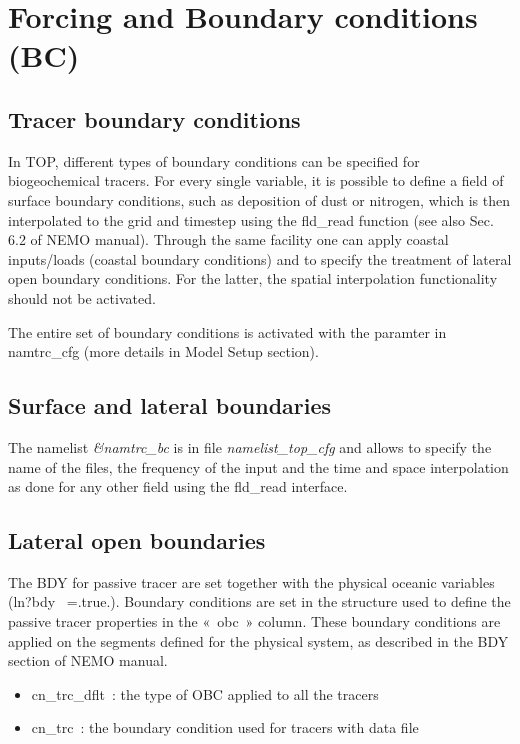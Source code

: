 \documentclass[../main/TOP_manual]{subfiles}
\begin{document}
\section{Forcing and Boundary conditions (BC)}

\subsection{Tracer boundary conditions}

In TOP, different types of boundary conditions can be specified for biogeochemical tracers. For every single variable, it is possible to define a field of surface boundary conditions, such as deposition of dust or nitrogen, which is then interpolated to the grid and timestep using the fld\_read function (see also Sec. 6.2 of NEMO manual). Through the same facility one can apply coastal inputs/loads (coastal boundary conditions) and to specify the treatment of lateral open boundary conditions. For the latter, the spatial interpolation functionality should not be activated. 

The entire set of boundary conditions is activated with the paramter  in namtrc\_cfg (more details in Model Setup section).

\subsection*{Surface and lateral boundaries}

The namelist \textit{\&namtrc\_bc}  is in file \textit{namelist\_top\_cfg}  and allows to specify the name of the files, the frequency of the input and the time and space interpolation as done for any other field using the fld\_read interface.

\subsection*{Lateral open boundaries}

The BDY for passive tracer are set together with the physical oceanic variables (ln?bdy  =.true.). Boundary conditions are set in the structure used to define the passive tracer properties in the « obc » column. These boundary conditions are applied on the segments defined for the physical system, as described in the BDY section of NEMO manual.
\begin{itemize}
	\item cn\_trc\_dflt : the type of OBC applied to all the tracers
	\item cn\_trc :  the boundary condition used for tracers with data file
\end{itemize} 
\end{document}
